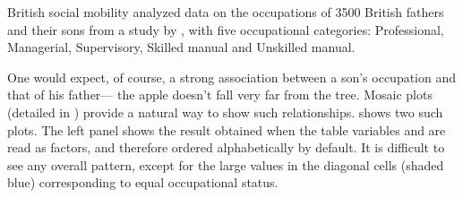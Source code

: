 \documentclass[10pt,krantz2]{krantz}\usepackage[]{graphicx}\usepackage[]{color}
\begin{document}
\begin{Example}[glass]{British social mobility}
\citet[p. 100]{Bishop-etal:75} analyzed data on the occupations of
3500 British fathers and their sons from a study by \citet{Glass:54},
with five occupational categories:
Professional, Managerial, Supervisory, Skilled manual and Unskilled manual.

One would expect, of course, a strong association between a son's
occupation and that of his father--- the apple doesn't
fall very far from the tree.
Mosaic plots (detailed in )
provide a natural way to show such relationships.
 shows two such plots.
The left panel shows the result obtained when the table variables
 and  are read as factors, and therefore
ordered alphabetically by default.
It is difficult to see any overall pattern, except for the
large values in the diagonal cells (shaded blue) corresponding to equal
occupational status.


\end{Example}
\end{document}
